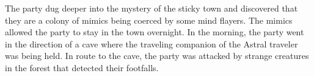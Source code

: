 The party dug deeper into the mystery of the sticky town and discovered that they are a colony of mimics being coerced by some mind flayers.
The mimics allowed the party to stay in the town overnight.
In the morning, the party went in the direction of a cave where the traveling companion of the Astral traveler was being held.
In route to the cave, the party was attacked by strange creatures in the forest that detected their footfalls.
